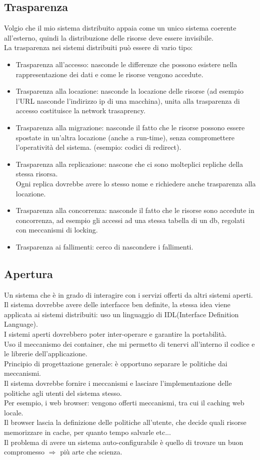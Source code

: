 \documentclass{article}
\begin{document}
\subsection{Trasparenza}
Volgio che il mio sistema distribuito appaia come un unico sistema coerente all'esterno, quindi la distribuzione delle risorse deve essere invisibile.\\La trasparenza nei sistemi distribuiti può essere di vario tipo:
\begin{itemize}
\item Trasparenza all'accesso: nasconde le differenze che possono esistere nella rappresentazione dei dati e come le risorse vengono accedute.
\item Trasparenza alla locazione: nasconde la locazione delle risorse (ad esempio l'URL nasconde l'indirizzo ip di una macchina), unita alla trasparenza di accesso costituisce la network trasaprency.
\item Trasparenza alla migrazione: nasconde il fatto che le risorse possono essere spostate in un'altra locazione (anche a run-time), senza compromettere l'operatività del sistema. (esempio: codici di redirect).
\item Trasparenza alla replicazione: nascone che ci sono molteplici repliche della stessa risorsa.\\ Ogni replica dovrebbe avere lo stesso nome e richiedere anche trasparenza alla locazione.
\item Trasparenza alla concorrenza: nasconde il fatto che le risorse sono accedute in concorrenza, ad esempio gli accessi ad una stessa tabella di un db, regolati con meccanismi di locking.
\item Trasparenza ai fallimenti: cerco di nascondere i fallimenti.
\end{itemize}
\subsection{Apertura}
Un sistema che è in grado di interagire con i servizi offerti da altri sistemi aperti.\\ Il sistema dovrebbe avere delle interfacce ben definite, la stessa idea viene applicata ai sistemi distribuiti: uso un linguaggio di IDL(Interface Definition Language).\\ I sistemi aperti dovrebbero poter inter-operare  e garantire la portabilità.\\ Uso il meccanismo dei container, che mi permetto di tenervi all'interno il codice e le librerie dell'applicazione.\\ Principio di progettazione generale: è opportuno separare le politiche dai meccanismi.\\ Il sistema dovrebbe fornire i meccanismi e lasciare l'implementazione delle politiche agli utenti del sistema stesso.\\ Per esempio, i web browser: vengono offerti meccanismi, tra cui il caching web locale.\\ Il browser lascia la definizione delle politiche all'utente, che decide quali risorse memorizzare in cache, per quanto tempo salvarle etc...\\ Il problema di avere un sistema auto-configurabile è quello di trovare un buon compromesso $\Rightarrow$ più arte che scienza.
\end{document}
